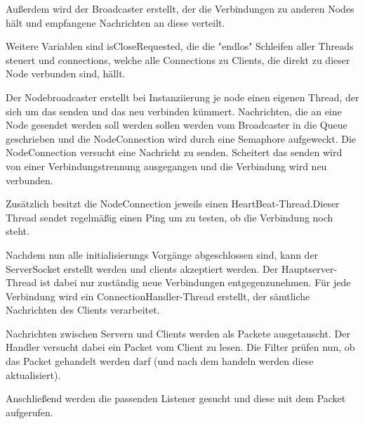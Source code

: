     Außerdem wird der Broadcaster erstellt, der die Verbindungen zu anderen Nodes hält und empfangene Nachrichten an diese verteilt.

    
   

    Weitere Variablen sind isCloseRequested, die die "endlos" Schleifen aller Threads steuert und connections, welche alle Connections zu Clients, die direkt zu dieser Node verbunden sind, hällt.

    Der Nodebroadcaster erstellt bei Instanziierung je node einen eigenen Thread, der sich um das senden und das neu verbinden kümmert.
    Nachrichten, die an eine Node gesendet werden soll werden sollen werden vom Broadcaster in die Queue geschrieben und die NodeConnection wird durch eine Semaphore aufgeweckt. 
    Die NodeConnection versucht eine Nachricht zu senden. Scheitert das senden wird von einer Verbindungstrennung ausgegangen und die Verbindung wird neu verbunden.
    
    Zusätzlich besitzt die NodeConnection jeweils einen HeartBeat-Thread.Dieser Thread sendet regelmäßig einen Ping um zu testen, ob die Verbindung noch steht.
    

    Nachdem nun alle initialisierungs Vorgänge abgeschlossen sind, kann der ServerSocket erstellt werden und clients akzeptiert werden.
    Der Hauptserver-Thread ist dabei nur zuständig neue Verbindungen entgegenzunehmen. Für jede Verbindung wird ein ConnectionHandler-Thread erstellt, der sämtliche Nachrichten des Clients verarbeitet.
    

    Nachrichten zwischen Servern und Clients werden als Packete ausgetauscht. Der Handler versucht dabei ein Packet vom Client zu lesen. Die Filter prüfen nun, ob das Packet gehandelt werden darf (und nach dem handeln werden diese aktualisiert).
    
    Anschließend werden die passenden Listener gesucht und diese mit dem Packet aufgerufen.
    
    


